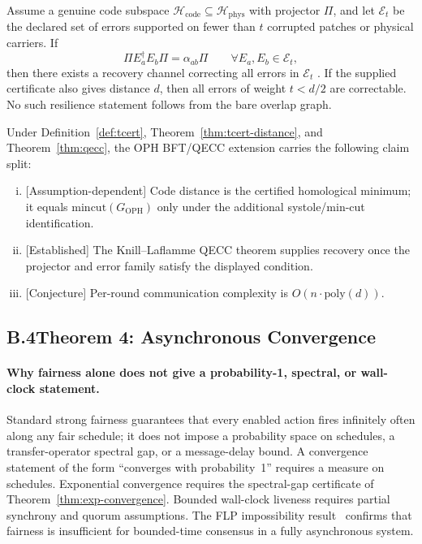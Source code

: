 \begin{theorem}
\label{thm:qecc}
Assume a genuine code subspace \(\mathcal H_{\mathrm{code}}\subseteq\mathcal H_{\mathrm{phys}}\)
with projector \(\Pi\), and let \(\mathcal E_t\) be the declared set of errors supported on fewer
than \(t\) corrupted patches or physical carriers. If
\[
\Pi E_a^\dagger E_b \Pi=\alpha_{ab}\Pi
\qquad
\forall E_a,E_b\in\mathcal E_t,
\]
then there exists a recovery channel correcting all errors in \(\mathcal E_t\)
\cite{KL97}. If the supplied certificate also gives distance \(d\), then all errors of weight
\(t<d/2\) are correctable. No such resilience statement follows from the bare overlap graph.
\end{theorem}

\begin{corollary}\label{cor:qecc-inventory}
Under Definition~\ref{def:tcert}, Theorem~\ref{thm:tcert-distance}, and
Theorem~\ref{thm:qecc}, the OPH BFT/QECC extension carries the following claim split:
\begin{enumerate}[(i)]
  \item \textrm{[Assumption-dependent]} Code distance is the certified homological minimum; it
        equals \(\mathrm{mincut}(G_{\mathrm{OPH}})\) only under the additional systole/min-cut
        identification.
  \item \textrm{[Established]} The Knill--Laflamme \textrm{QECC}
        theorem supplies recovery once the projector and error family satisfy the displayed
        condition.
  \item \textrm{[Conjecture]} Per-round communication complexity is
        $O(n\cdot\mathrm{poly}(d))$.
\end{enumerate}
\end{corollary}

\subsection*{B.4\quad Theorem 4: Asynchronous Convergence}

\paragraph{Why fairness alone does not give a probability-1, spectral, or wall-clock statement.}
Standard strong fairness guarantees that every enabled action fires infinitely often along any fair
schedule; it does not impose a probability space on schedules, a transfer-operator spectral gap,
or a message-delay bound. A convergence statement of the form ``converges with probability~1''
requires a measure on schedules. Exponential convergence requires the spectral-gap certificate of
Theorem~\ref{thm:exp-convergence}. Bounded wall-clock liveness requires partial synchrony and
quorum assumptions. The \textrm{FLP} impossibility result~\cite{FLP85} confirms that fairness is
insufficient for bounded-time consensus in a fully asynchronous system.

